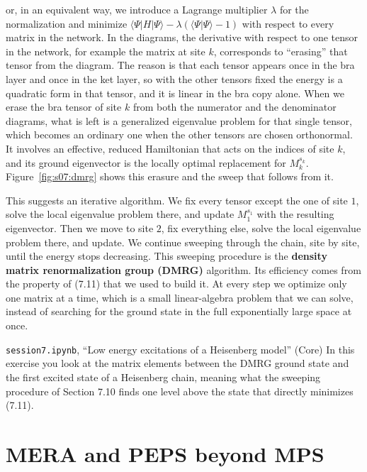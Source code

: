 or, in an equivalent way, we introduce a Lagrange multiplier $\lambda$ for the normalization and
minimize $\langle
\Psi|H|\Psi\rangle - \lambda\left(\langle\Psi|\Psi\rangle - 1\right)$ with respect to every matrix in
the network. In the diagrams, the derivative with respect to one tensor in the network, for example
the matrix at site $k$, corresponds to ``erasing'' that tensor from the diagram. The reason is that
each tensor appears once in the bra layer and once in the ket layer, so with the other tensors fixed
the energy is a quadratic form in that tensor, and it is linear in the bra copy alone. When we erase
the bra tensor of site $k$ from both the numerator and the denominator diagrams, what is left is a
generalized eigenvalue problem for that single tensor, which becomes an ordinary one when the other
tensors are chosen orthonormal. It involves an effective, reduced Hamiltonian that acts on the
indices of site $k$, and its ground eigenvector is the locally optimal
replacement for $M_k^{s_k}$. Figure~\ref{fig:s07:dmrg} shows this erasure and the sweep that follows
from it.



This suggests an iterative algorithm. We fix every tensor except the
one of site $1$, solve the local eigenvalue problem there, and update $M_1^{s_1}$ with the resulting
eigenvector. Then we move to site $2$, fix everything else, solve the local eigenvalue problem there,
and update. We continue sweeping through the chain, site by site, until the energy stops decreasing.
This sweeping procedure is the \textbf{density matrix renormalization group (DMRG)} algorithm. Its
efficiency comes from the property of (7.11) that we used to build it. At every step we optimize only
one matrix at a time, which is a small linear-algebra problem that we can solve, instead of searching
for the ground state in the full exponentially large space at once.

\begin{notebookbox}{\texttt{session7.ipynb}, ``Low energy excitations of a Heisenberg model'' (Core)}
In this exercise you look at the matrix elements between the DMRG ground state and the first excited
state of a Heisenberg chain, meaning what the sweeping procedure of Section 7.10 finds one level above
the state that directly minimizes (7.11).
\end{notebookbox}

\section{MERA and PEPS beyond MPS}

